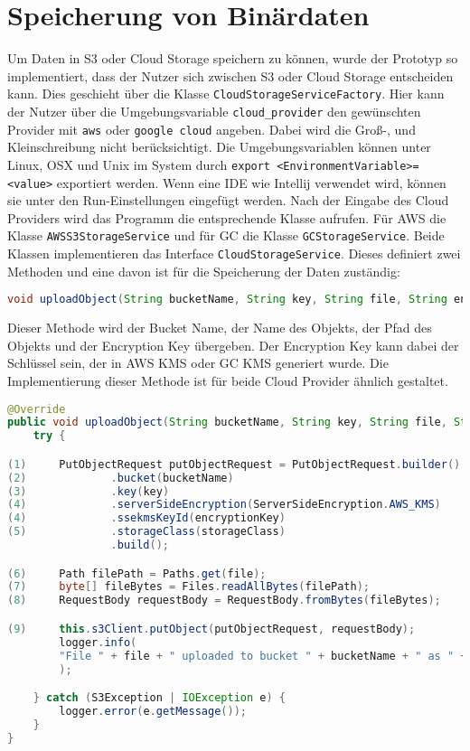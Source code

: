 \newpage

\section{Speicherung von Binärdaten}

Um Daten in S3 oder Cloud Storage speichern zu können, wurde der Prototyp so implementiert, dass der Nutzer sich zwischen S3 oder Cloud Storage entscheiden kann. Dies geschieht über die Klasse \verb|CloudStorageServiceFactory|. Hier kann der Nutzer über die Umgebungsvariable \verb|cloud_provider| den gewünschten Provider mit \verb|aws| oder \verb|google cloud| angeben. Dabei wird die Groß-, und Kleinschreibung nicht berücksichtigt. Die Umgebungsvariablen können unter Linux, OSX und Unix im System durch \verb|export <EnvironmentVariable>=<value>| exportiert werden. Wenn eine IDE wie Intellij verwendet wird, können sie unter den Run-Einstellungen eingefügt werden. Nach der Eingabe des Cloud Providers wird das Programm die entsprechende Klasse aufrufen. Für AWS die Klasse \verb|AWSS3StorageService| und für GC die Klasse \verb|GCStorageService|. Beide Klassen implementieren das Interface \verb|CloudStorageService|. Dieses definiert zwei Methoden und eine davon ist für die Speicherung der Daten zuständig:

\begin{lstlisting}[language=Java]
void uploadObject(String bucketName, String key, String file, String encryptionKey, String storageClass) throws IOException;
\end{lstlisting}
	
Dieser Methode wird der Bucket Name, der Name des Objekts, der Pfad des Objekts und der Encryption Key übergeben. Der Encryption Key kann dabei der Schlüssel sein, der in AWS KMS oder GC KMS generiert wurde. Die Implementierung dieser Methode ist für beide Cloud Provider ähnlich gestaltet.

\begin{lstlisting}[language=Java, caption=Prototyp Code Snippet - Hochladen eines Objekts nach S3]
@Override
public void uploadObject(String bucketName, String key, String file, String encryptionKey, String storageClass) {
    try {

(1)     PutObjectRequest putObjectRequest = PutObjectRequest.builder()
(2)             .bucket(bucketName)
(3)             .key(key)
(4)             .serverSideEncryption(ServerSideEncryption.AWS_KMS)
(4)             .ssekmsKeyId(encryptionKey)
(5)             .storageClass(storageClass)
                .build();

(6)     Path filePath = Paths.get(file);
(7)     byte[] fileBytes = Files.readAllBytes(filePath);
(8)     RequestBody requestBody = RequestBody.fromBytes(fileBytes);

(9)     this.s3Client.putObject(putObjectRequest, requestBody);
        logger.info(
        "File " + file + " uploaded to bucket " + bucketName + " as " + key
        );

    } catch (S3Exception | IOException e) {
        logger.error(e.getMessage());
    }
}
\end{lstlisting}

